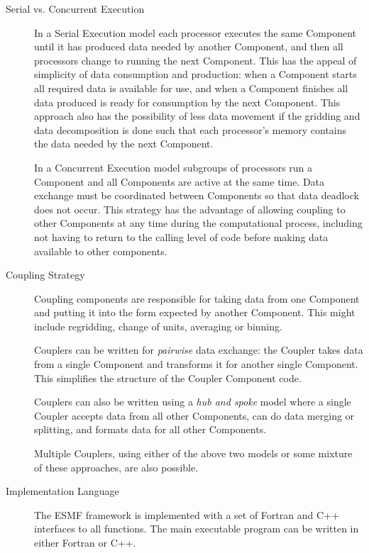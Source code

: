 \begin{description}

\item[Serial vs. Concurrent Execution]

In a Serial Execution model each processor 
executes the same Component until it has produced data needed
by another Component, and then all processors change to
running the next Component.  This has the appeal of simplicity
of data consumption and production: when a Component starts
all required data is available for use, and when a Component finishes
all data produced is ready for consumption by the next Component. 
This approach also has
the possibility of less data movement if the gridding and
data decomposition is done such that each processor's memory contains
the data needed by the next Component.

In a Concurrent Execution model subgroups of processors run
a Component and all Components are active at the same time.  
Data exchange must be coordinated between Components so that
data deadlock does not occur.  This strategy has the advantage
of allowing coupling to other Components at any time during
the computational process, including not having to return to
the calling level of code before making data available to 
other components.

\item[Coupling Strategy]

Coupling components are responsible for taking data from one
Component and putting it into the form expected by another Component.
This might include regridding, change of units, averaging or binning.

Couplers can be written for {\it pairwise} data exchange: the Coupler takes
data from a single Component and transforms it for another single Component.
This simplifies the structure of the Coupler Component code.

Couplers can also be written using a {\it hub and spoke} model where a
single Coupler accepts data from all other Components, can do data
merging or splitting, and formats data for all other Components.

Multiple Couplers, using either of the above two models or some mixture of
these approaches, are also possible.

\item[Implementation Language]

The ESMF framework is implemented with a set of Fortran and C++ interfaces
to all functions.  The main executable program can be written in either
Fortran or C++.


\end{description}
